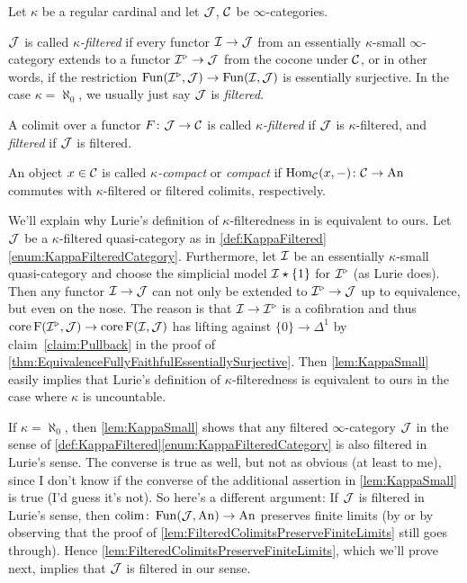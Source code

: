 \begin{defi}\label{def:KappaFiltered}
	Let $\kappa$ be a regular cardinal and let $\mathcal{J}$, $\mathcal{C}$ be $\infty$-categories.
	\begin{alphanumerate}
		\item $\mathcal{J}$ is called \emph{$\kappa$-filtered} if every functor $\mathcal{I}\rightarrow\mathcal{J}$ from an essentially $\kappa$-small $\infty$-category extends to a functor $\mathcal{I}^\triangleright\rightarrow\mathcal{J}$ from the cocone under $\mathcal{C}$, or in other words, if the restriction $\operatorname{Fun}(\mathcal{I}^\triangleright,\mathcal{J})\rightarrow\operatorname{Fun}(\mathcal{I},\mathcal{J})$ is essentially surjective. In the case $\kappa=\aleph_0$, we usually just say $\mathcal{J}$ is \emph{filtered}.\label{enum:KappaFilteredCategory}
		\item A colimit over a functor $F\colon \mathcal{J}\rightarrow\mathcal{C}$ is called \emph{$\kappa$-filtered} if $\mathcal{J}$ is $\kappa$-filtered, and \emph{filtered} if $\mathcal{J}$ is filtered.\label{enum:KappaFilteredColimit}
		\item An object $x\in\mathcal{C}$ is called \emph{$\kappa$-compact} or \emph{compact} if $\operatorname{Hom}_{\mathcal{C}}(x,-)\colon \mathcal{C}\rightarrow\mathrm{An}$ commutes with $\kappa$-filtered or filtered colimits, respectively.\label{enum:KappaCompact} 
	\end{alphanumerate}
\end{defi}
\begin{rem}\label{rem:LuriesFilteredness}
	We'll explain why Lurie's definition of $\kappa$-filteredness in \cite[Definition~]{HTT} is equivalent to ours. Let $\mathcal{J}$ be a $\kappa$-filtered quasi-category as in \cref{def:KappaFiltered}\cref{enum:KappaFilteredCategory}. Furthermore, let $\mathcal{I}$ be an essentially $\kappa$-small quasi-category and choose the simplicial model $\mathcal{I}\star\{1\}$ for $\mathcal{I}^\triangleright$ (as Lurie does). Then any functor $\mathcal{I}\rightarrow\mathcal{J}$ can not only be extended to $\mathcal{I}^\triangleright\rightarrow\mathcal{J}$ up to equivalence, but even on the nose. The reason is that $\mathcal{I}\rightarrow\mathcal{I}^\triangleright$ is a cofibration and thus $\operatorname{core}\operatorname{F}(\mathcal{I}^\triangleright,\mathcal{J})\rightarrow \operatorname{core}\operatorname{F}(\mathcal{I},\mathcal{J})$ has lifting against $\{0\}\rightarrow\Delta^1$ by claim~\cref{claim:Pullback} in the proof of \cref{thm:EquivalenceFullyFaithfulEssentiallySurjective}. Then \cref{lem:KappaSmall} easily implies that Lurie's definition of $\kappa$-filteredness is equivalent to ours in the case where $\kappa$ is uncountable.
	
	If $\kappa=\aleph_0$, then \cref{lem:KappaSmall} shows that any filtered $\infty$-category $\mathcal{J}$ in the sense of \cref{def:KappaFiltered}\cref{enum:KappaFilteredCategory} is also filtered in Lurie's sense. The converse is true as well, but not as obvious (at least to me), since I don't know if the converse of the additional assertion in \cref{lem:KappaSmall} is true (I'd guess it's not). So here's a different argument: If $\mathcal{J}$ is filtered in Lurie's sense, then $\operatorname*{colim}\colon \operatorname{Fun}(\mathcal{J},\mathrm{An})\rightarrow\mathrm{An}$ preserves finite limits (by \cite[Proposition~]{HTT} or by observing that the proof of \cref{lem:FilteredColimitsPreserveFiniteLimits} still goes through). Hence \cref{lem:FilteredColimitsPreserveFiniteLimits}, which we'll prove next, implies that $\mathcal{J}$ is filtered in our sense. 
\end{rem}

